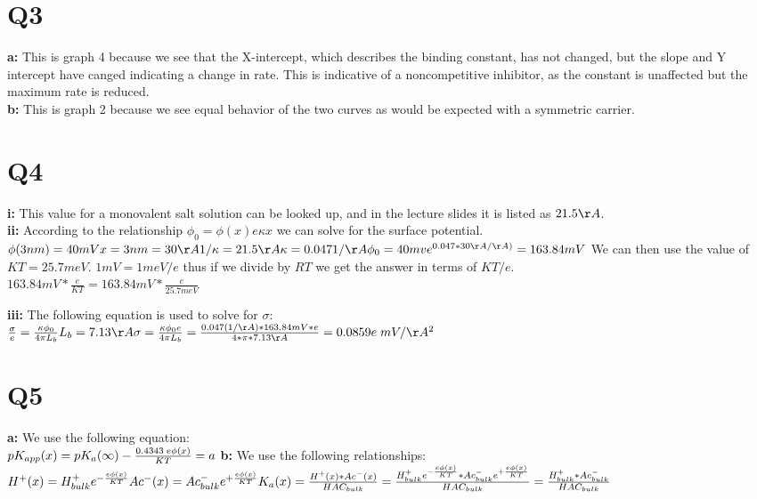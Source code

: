 \documentclass[12pt]{article}
\begin{document}
\section{Q3}
\textbf{a: } This is graph 4 because we see that the X-intercept, which describes the binding constant, has not changed, but the slope and Y intercept have canged indicating a change in rate. This is indicative of a noncompetitive inhibitor, as the constant is unaffected but the maximum rate is reduced.\\
\textbf{b: } This is graph 2 because we see equal behavior of the two curves as would be expected with a symmetric carrier.

\section{Q4}
\textbf{i: } This value for a monovalent salt solution can be looked up, and in the lecture slides it is listed as $21.5\AA$. \\
\textbf{ii: } According to the relationship $\phi_0 = \phi(x)e{\kappa x}$ we can solve for the surface potential.\\
$\phi(3nm) = 40 mV\\
x = 3nm = 30\AA\\
1/\kappa = 21.5\AA\\
\kappa = 0.047 1/\AA\\
\phi_0 = 40 mv e^{0.047 * 30 \AA/\AA)} = 163.84 mV\\$
We can then use the value of $KT = 25.7 meV$. $1mV = 1 meV/e$ thus if we divide by $RT$ we get the answer in terms of $KT/e$.\\ 
$163.84 mV * \frac{e}{KT} = 163.84 mV * \frac{e}{25.7 meV} $ 

\noindent\textbf{iii: } The following equation is used to solve for $\sigma$:\\
$
\frac{\sigma}{e} = \frac{\kappa \phi_0}{4\pi L_b}\\
L_b = 7.13\AA\\
\sigma = \frac{\kappa \phi_0 e}{4\pi L_b} = \frac{0.047 (1/\AA) * 163.84 mV * e}{4*\pi*7.13\AA} = 0.0859e\; mV/\AA ^2\\$

\section{Q5}
\textbf{a: } We use the following equation:\\
$
pK_{app}(x) = pK_a(\infty) - \frac{0.4343\;e\phi(x)}{KT} =a \\
$
\textbf{b: }
We use the following relationships:\\
$
H^+(x) = H^+_{bulk} e^{-\frac{e\phi(x)}{KT}}\\
Ac^-(x) = Ac^-_{bulk} e^{+\frac{e\phi(x)}{KT}}\\
K_a(x) = \frac{H^+(x) * Ac^-(x)}{HAC_{bulk}} = \frac{ H^+_{bulk} e^{-\frac{e\phi(x)}{KT}} * Ac^-_{bulk} e^{+\frac{e\phi(x)}{KT}}}{HAC_{bulk}} =\frac{H^+_{bulk} * Ac^-_{bulk}}{HAC_{bulk}} 
$
\end{document}
